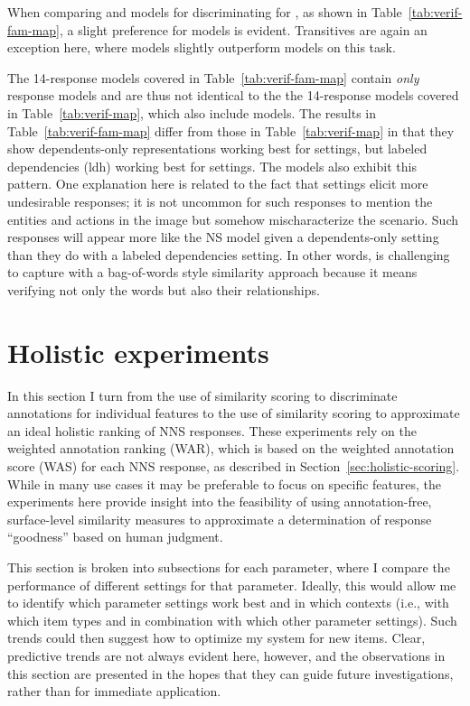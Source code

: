 When comparing  and  models for discriminating for , as shown in Table~\ref{tab:verif-fam-map}, a slight preference for  models is evident. Transitives are again an exception here, where  models slightly outperform  models on this task.

The  14-response models covered in Table~\ref{tab:verif-fam-map} contain \textit{only}  response models and are thus not identical to the the  14-response models covered in Table~\ref{tab:verif-map}, which also include  models. The  results in Table~\ref{tab:verif-fam-map} differ from those in Table~\ref{tab:verif-map} in that they show dependents-only representations working best for   settings, but  labeled dependencies (ldh) working best for  settings. The  models also exhibit this pattern. One explanation here is related to the fact that   settings elicit more undesirable responses; it is not uncommon for such responses to mention the entities and actions in the image but somehow mischaracterize the scenario. Such responses will appear more like the NS model given a dependents-only setting than they do with a labeled dependencies setting. In other words,  is challenging to capture with a bag-of-words style similarity approach because it means verifying not only the words but also their relationships.


\section{Holistic experiments}
\label{sec:exp-holistic}
In this section I turn from the use of similarity scoring to discriminate annotations for individual features to the use of similarity scoring to approximate an ideal holistic ranking of NNS responses. These experiments rely on the weighted annotation ranking (WAR), which is based on the weighted annotation score (WAS) for each NNS response, as described in Section~\ref{sec:holistic-scoring}. While in many use cases it may be preferable to focus on specific features, the experiments here provide insight into the feasibility of using annotation-free, surface-level similarity measures to approximate a determination of response ``goodness'' based on human judgment.

This section is broken into subsections for each parameter, where I compare the performance of different settings for that parameter. Ideally, this would allow me to identify which parameter settings work best and in which contexts (i.e., with which item types and in combination with which other parameter settings). Such trends could then suggest how to optimize my system for new items. Clear, predictive trends are not always evident here, however, and the observations in this section are presented in the hopes that they can guide future investigations, rather than for immediate application.


